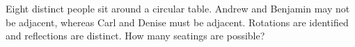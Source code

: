 Eight distinct people sit around a circular table. Andrew and Benjamin may not be adjacent, whereas Carl and Denise must be adjacent. Rotations are identified and reflections are distinct. How many seatings are possible?
